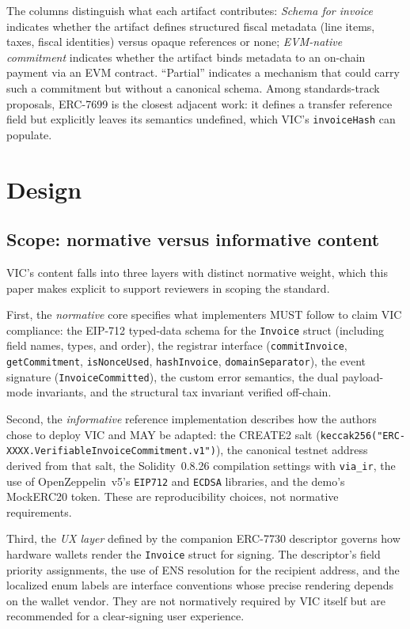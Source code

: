 \documentclass[11pt,a4paper]{article}
\begin{document}
The columns distinguish what each artifact contributes: \emph{Schema for invoice}
indicates whether the artifact defines structured fiscal metadata (line items, taxes,
fiscal identities) versus opaque references or none; \emph{EVM-native commitment}
indicates whether the artifact binds metadata to an on-chain payment via an EVM
contract. ``Partial'' indicates a mechanism that could carry such a commitment but
without a canonical schema. Among standards-track proposals, ERC-7699 is the closest
adjacent work: it defines a transfer reference field but explicitly leaves its
semantics undefined, which VIC's \texttt{invoiceHash} can populate.

\section{Design}
\label{sec:design}

\subsection{Scope: normative versus informative content}
\label{subsec:scope}

VIC's content falls into three layers with distinct normative weight, which this
paper makes explicit to support reviewers in scoping the standard.

First, the \emph{normative} core specifies what implementers MUST follow to claim
VIC compliance: the EIP-712 typed-data schema for the \texttt{Invoice} struct
(including field names, types, and order), the registrar interface
(\texttt{commitInvoice}, \texttt{getCommitment}, \texttt{isNonceUsed},
\texttt{hashInvoice}, \texttt{domainSeparator}), the event signature
(\texttt{InvoiceCommitted}), the custom error semantics, the dual payload-mode
invariants, and the structural tax invariant verified off-chain.

Second, the \emph{informative} reference implementation describes how the authors
chose to deploy VIC and MAY be adapted: the CREATE2 salt
(\texttt{keccak256("ERC-XXXX.VerifiableInvoiceCommitment.v1")}), the canonical
testnet address derived from that salt, the Solidity~0.8.26 compilation settings
with \texttt{via\_ir}, the use of OpenZeppelin~v5's \texttt{EIP712} and
\texttt{ECDSA} libraries, and the demo's MockERC20 token. These are reproducibility
choices, not normative requirements.

Third, the \emph{UX layer} defined by the companion ERC-7730 descriptor governs how
hardware wallets render the \texttt{Invoice} struct for signing. The descriptor's
field priority assignments, the use of ENS resolution for the recipient address,
and the localized enum labels are interface conventions whose precise rendering
depends on the wallet vendor. They are not normatively required by VIC itself but
are recommended for a clear-signing user experience.
\end{document}
